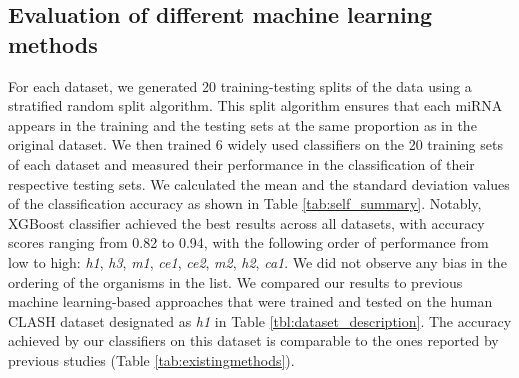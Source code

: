 \subsection{Evaluation of different machine learning methods} \label{sec:evaluation_different_ML}
For each dataset, we generated 20 training-testing splits of the data using a stratified random split algorithm. This split algorithm ensures that each miRNA appears in the training and the testing sets at the same proportion as in the original dataset.
We then trained 6 widely used classifiers on the 20 training sets of each dataset and measured their performance in the classification of their respective testing sets. We calculated the mean and the standard deviation values of the classification accuracy as shown in Table \ref{tab:self_summary}. Notably, XGBoost classifier achieved the best results across all datasets, with accuracy scores ranging from 0.82 to 0.94, with the following order of performance from low to high: \textit{h1},  \textit{h3},  \textit{m1}, \textit{ce1}, \textit{ce2}, \textit{m2}, \textit{h2}, \textit{ca1}. We did not observe any bias in the ordering of the organisms in the list.   
We compared our results to previous machine learning-based approaches that were trained and tested on the human CLASH dataset designated as \textit{h1} in Table \ref{tbl:dataset_description}. The accuracy achieved by our classifiers on this dataset is comparable to the ones reported by previous studies (Table \ref{tab:existingmethods}). 



